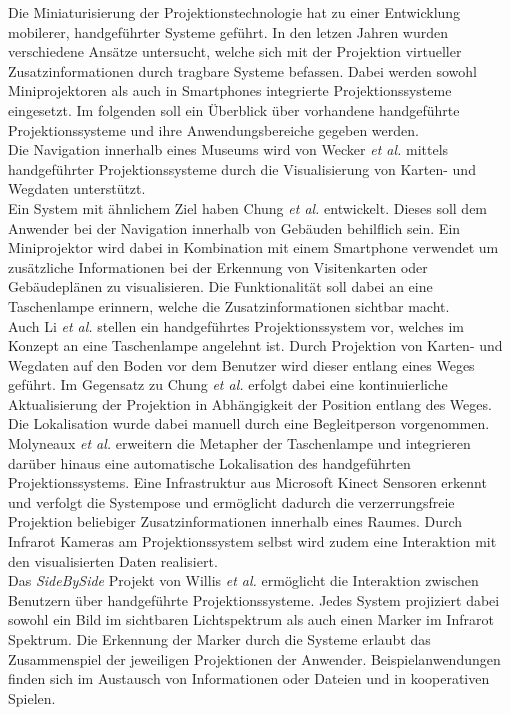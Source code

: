 Die Miniaturisierung der Projektionstechnologie hat zu einer Entwicklung mobilerer, handgeführter Systeme geführt. In den letzen Jahren wurden verschiedene Ansätze untersucht, welche sich mit der Projektion virtueller Zusatzinformationen durch tragbare Systeme befassen. Dabei werden sowohl Miniprojektoren als auch in Smartphones integrierte Projektionssysteme eingesetzt. Im folgenden soll ein Überblick über vorhandene handgeführte Projektionssysteme und ihre Anwendungsbereiche gegeben werden.\\
Die Navigation innerhalb eines Museums wird von Wecker \textit{et al.} \cite{Wecker2013} mittels handgeführter Projektionssysteme durch die Visualisierung von Karten- und Wegdaten unterstützt.\\
Ein System mit ähnlichem Ziel haben Chung \textit{et al.} \cite{Chung2011} entwickelt. Dieses soll dem Anwender bei der Navigation innerhalb von Gebäuden behilflich sein. Ein Miniprojektor wird dabei in Kombination mit einem Smartphone verwendet um zusätzliche Informationen bei der Erkennung von Visitenkarten oder Gebäudeplänen zu visualisieren. Die Funktionalität soll dabei an eine Taschenlampe erinnern, welche die Zusatzinformationen sichtbar macht.\\
Auch Li \textit{et al.} \cite{Li2013} stellen ein handgeführtes Projektionssystem vor, welches im Konzept an eine Taschenlampe angelehnt ist. Durch Projektion von Karten- und Wegdaten auf den Boden vor dem Benutzer wird dieser entlang eines Weges geführt. Im Gegensatz zu Chung \textit{et al.} erfolgt dabei eine kontinuierliche Aktualisierung der Projektion in Abhängigkeit der Position entlang des Weges. Die Lokalisation wurde dabei manuell durch eine Begleitperson vorgenommen.\\
Molyneaux \textit{et al.} \cite{Molyneaux2012} erweitern die Metapher der Taschenlampe und integrieren darüber hinaus eine automatische Lokalisation des handgeführten Projektionssystems. Eine Infrastruktur aus Microsoft Kinect Sensoren erkennt und verfolgt die Systempose und ermöglicht dadurch die verzerrungsfreie Projektion beliebiger Zusatzinformationen innerhalb eines Raumes. Durch Infrarot Kameras am Projektionssystem selbst wird zudem eine Interaktion mit den visualisierten Daten realisiert.\\
Das \textit{SideBySide} Projekt von Willis \textit{et al.} \cite{Willis2011} ermöglicht die Interaktion zwischen Benutzern über handgeführte Projektionssysteme. Jedes System projiziert dabei sowohl ein Bild im sichtbaren Lichtspektrum als auch einen Marker im Infrarot Spektrum. Die Erkennung der Marker durch die Systeme erlaubt das Zusammenspiel der jeweiligen Projektionen der Anwender. Beispielanwendungen finden sich im Austausch von Informationen oder Dateien und in kooperativen Spielen.\\
